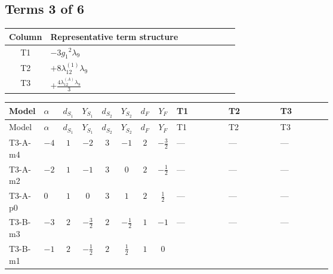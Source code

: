 \documentclass[8pt]{article}
\begin{document}
\begin{landscape}
\subsection*{Terms 3 of 6}
\begin{center}
\begin{tabular}{@{}c >{\raggedright\arraybackslash}p{0.82\linewidth}@{}}
\toprule
Column & Representative term structure \\
\midrule
T1 & \(\displaystyle -3 {g_1}^2 {\lambda_{9}}\) \\
\midrule
T2 & \(\displaystyle +8 {\lambda_{12}^{(1)}} {\lambda_{9}}\) \\
\midrule
T3 & \(\displaystyle +\frac{4 {\lambda_{12}^{(A)}} {\lambda_{9}}}{3}\) \\
\midrule
\bottomrule
\end{tabular}
\end{center}
\smallskip
\tiny
\begin{longtable}{@{}llcccccc >{\raggedright\arraybackslash}p{0.21\linewidth} >{\raggedright\arraybackslash}p{0.21\linewidth} >{\raggedright\arraybackslash}p{0.21\linewidth}@{}}
\toprule
Model & $\alpha$ & $d_{S_1}$ & $Y_{S_1}$ & $d_{S_2}$ & $Y_{S_2}$ & $d_F$ & $Y_F$ & T1 & T2 & T3 \\
\midrule
\endfirsthead
\toprule
Model & $\alpha$ & $d_{S_1}$ & $Y_{S_1}$ & $d_{S_2}$ & $Y_{S_2}$ & $d_F$ & $Y_F$ & T1 & T2 & T3 \\
\midrule
\endhead
T3-A-m4 & $-4$ & $1$ & $-2$ & $3$ & $-1$ & $2$ & $-\frac{3}{2}$ & --- & --- & --- \\
\midrule
T3-A-m2 & $-2$ & $1$ & $-1$ & $3$ & $0$ & $2$ & $-\frac{1}{2}$ & --- & --- & --- \\
\midrule
T3-A-p0 & $0$ & $1$ & $0$ & $3$ & $1$ & $2$ & $\frac{1}{2}$ & --- & --- & --- \\
\midrule
T3-B-m3 & $-3$ & $2$ & $-\frac{3}{2}$ & $2$ & $-\frac{1}{2}$ & $1$ & $-1$ & --- & --- & --- \\
\midrule
T3-B-m1 & $-1$ & $2$ & $-\frac{1}{2}$ & $2$ & $\frac{1}{2}$ & $1$ & $0$ & \scriptsize\adjustbox{max width=\linewidth}{$\begin{gathered} -3 {g_1}^2 {\lambda_{9}}\end{gathered}$} & \scriptsize\adjustbox{max width=\linewidth}{$\begin{gathered} +8 {\lambda_{12}^{(1)}} {\lambda_{9}}\end{gathered}$} & \scriptsize\adjustbox{max width=\linewidth}{$\begin{gathered} +\frac{4 {\lambda_{12}^{(A)}} {\lambda_{9}}}{3}\end{gathered}$} \\

\end{longtable}
\end{landscape}
\end{document}
